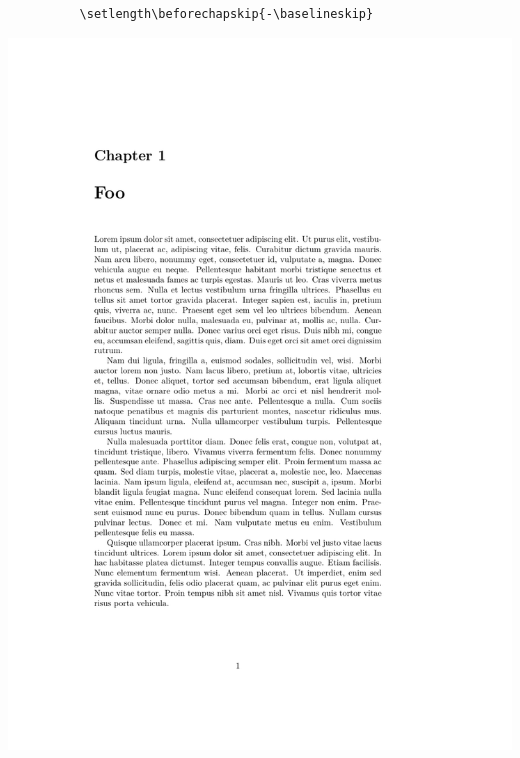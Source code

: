 \documentclass{beamer}
\begin{document}
\begin{frame}[fragile]
\begin{overprint}
\begin{columns}
      \begin{column}{0.5\textwidth}
        \begin{verbatim}
          \setlength\beforechapskip{-\baselineskip}
        \end{verbatim}
        \begin{center}
          \includegraphics[frame,page=1,width=0.8\linewidth]{chapterheadstart-2}
        \end{center}
      \end{column}
    \end{columns}


\end{overprint}
\end{frame}
\end{document}
